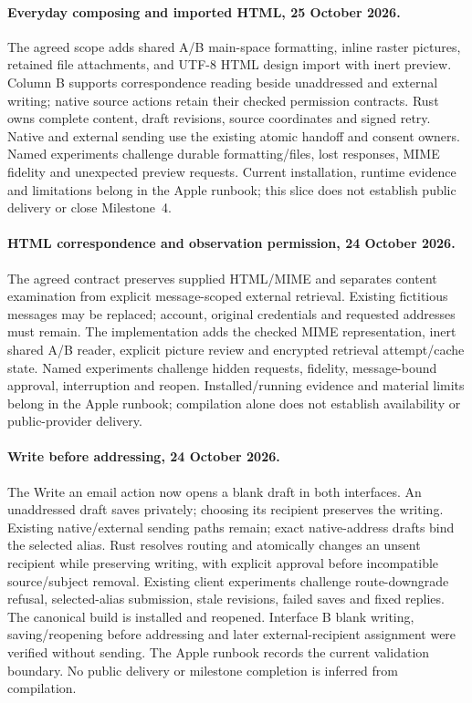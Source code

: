 \documentclass[11pt]{article}
\begin{document}
\paragraph{Everyday composing and imported HTML, 25 October 2026.}
The agreed scope adds shared A/B main-space formatting, inline raster pictures,
retained file attachments, and UTF-8 HTML design import with inert preview.
Column B supports correspondence reading beside unaddressed and external writing;
native source actions retain their checked permission contracts. Rust owns complete
content, draft revisions, source coordinates and signed retry. Native and external
sending use the existing atomic handoff and consent owners. Named experiments
challenge durable formatting/files, lost responses, MIME fidelity and unexpected
preview requests. Current installation, runtime evidence and limitations belong
in the Apple runbook; this slice does not establish public delivery or close
Milestone~4.


\paragraph{HTML correspondence and observation permission, 24 October 2026.}
The agreed contract preserves supplied HTML/MIME and separates content examination
from explicit message-scoped external retrieval. Existing fictitious messages may
be replaced; account, original credentials and requested addresses must remain.
The implementation adds the checked MIME representation, inert shared A/B reader,
explicit picture review and encrypted retrieval attempt/cache state. Named experiments
challenge hidden requests, fidelity, message-bound approval, interruption and reopen.
Installed/running evidence and material limits belong in the Apple runbook; compilation
alone does not establish availability or public-provider delivery.


\paragraph{Write before addressing, 24 October 2026.}
The Write an email action now opens a blank draft in both interfaces.
An unaddressed draft saves privately; choosing its recipient preserves the writing.
Existing native/external sending paths remain; exact native-address drafts bind the
selected alias. Rust resolves routing and atomically changes an unsent recipient
while preserving writing, with explicit approval before incompatible source/subject
removal. Existing client experiments challenge route-downgrade refusal, selected-alias
submission, stale revisions, failed saves and fixed replies. The canonical build is
installed and reopened. Interface B blank writing, saving/reopening before
addressing and later external-recipient assignment were verified without sending.
The Apple runbook records the current validation boundary. No public delivery or
milestone completion is inferred from compilation.
\end{document}
